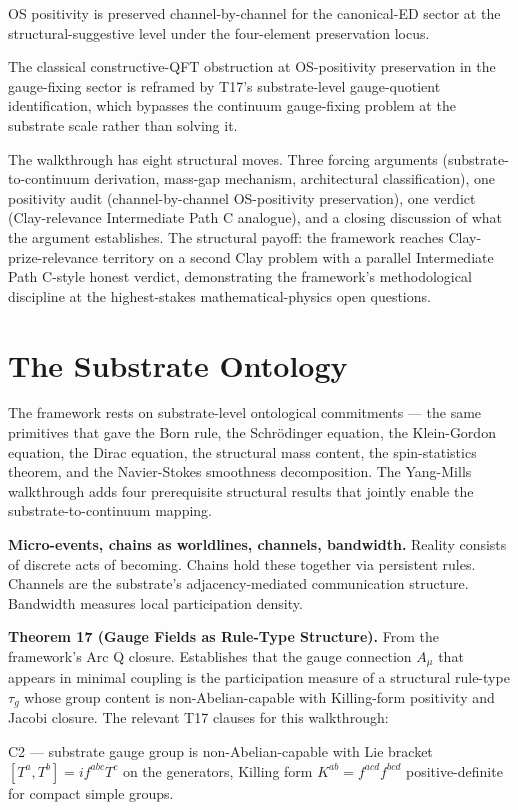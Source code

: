 \documentclass[11pt,a4paper]{article}
\begin{document}
OS positivity is preserved channel-by-channel for the canonical-ED sector at the structural-suggestive level under the four-element preservation locus.

The classical constructive-QFT obstruction at OS-positivity preservation in the gauge-fixing sector is reframed by T17's substrate-level gauge-quotient identification, which bypasses the continuum gauge-fixing problem at the substrate scale rather than solving it.

The walkthrough has eight structural moves. Three forcing arguments (substrate-to-continuum derivation, mass-gap mechanism, architectural classification), one positivity audit (channel-by-channel OS-positivity preservation), one verdict (Clay-relevance Intermediate Path C analogue), and a closing discussion of what the argument establishes. The structural payoff: the framework reaches Clay-prize-relevance territory on a second Clay problem with a parallel Intermediate Path C-style honest verdict, demonstrating the framework's methodological discipline at the highest-stakes mathematical-physics open questions.

\section{The Substrate Ontology}

The framework rests on substrate-level ontological commitments --- the same primitives that gave the Born rule, the Schr\"odinger equation, the Klein-Gordon equation, the Dirac equation, the structural mass content, the spin-statistics theorem, and the Navier-Stokes smoothness decomposition. The Yang-Mills walkthrough adds four prerequisite structural results that jointly enable the substrate-to-continuum mapping.

\textbf{Micro-events, chains as worldlines, channels, bandwidth.} Reality consists of discrete acts of becoming. Chains hold these together via persistent rules. Channels are the substrate's adjacency-mediated communication structure. Bandwidth measures local participation density.

\textbf{Theorem 17 (Gauge Fields as Rule-Type Structure).} From the framework's Arc Q closure. Establishes that the gauge connection $A_\mu$ that appears in minimal coupling is the participation measure of a structural rule-type $\tau_g$ whose group content is non-Abelian-capable with Killing-form positivity and Jacobi closure. The relevant T17 clauses for this walkthrough:

C2 --- substrate gauge group is non-Abelian-capable with Lie bracket $[T^a, T^b] = i f^{abc} T^c$ on the generators, Killing form $K^{ab} = f^{acd} f^{bcd}$ positive-definite for compact simple groups.
\end{document}
